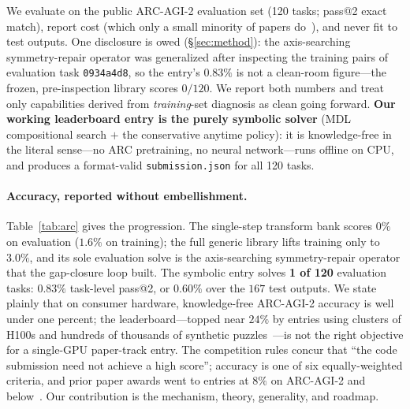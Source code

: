 We evaluate on the public ARC-AGI-2 evaluation set (120 tasks; pass@2 exact match), report cost (which only
a small minority of papers do~\cite{survey2026arc}), and never fit to test outputs. One disclosure is owed
(\S\ref{sec:method}): the axis-searching symmetry-repair operator was generalized after inspecting the
training pairs of evaluation task \texttt{0934a4d8}, so the entry's $0.83\%$ is not a clean-room figure---the
frozen, pre-inspection library scores $0/120$. We report both numbers and treat only capabilities derived from
\emph{training}-set diagnosis as clean going forward. \textbf{Our working
leaderboard entry is the purely symbolic solver} (MDL compositional search $+$ the conservative anytime
policy): it is knowledge-free in the literal sense---no ARC pretraining, no neural network---runs offline on
CPU, and produces a format-valid \texttt{submission.json} for all 120 tasks.

\paragraph{Accuracy, reported without embellishment.} Table~\ref{tab:arc} gives the progression. The
single-step transform bank scores $0\%$ on evaluation ($1.6\%$ on training); the full generic library lifts
training only to $3.0\%$, and its sole evaluation solve is the axis-searching symmetry-repair operator that
the gap-closure loop built. The symbolic entry solves \textbf{1 of 120} evaluation tasks: $0.83\%$ task-level
pass@2, or $0.60\%$ over the $167$ test outputs. We state plainly that on consumer hardware, knowledge-free ARC-AGI-2
accuracy is well under one percent; the leaderboard---topped near $24\%$ by entries using clusters of H100s
and hundreds of thousands of synthetic puzzles~\cite{arcprize2025techreport}---is not the right objective for
a single-GPU paper-track entry. The competition rules concur that ``the code submission need not achieve a
high score''; accuracy is one of six equally-weighted criteria, and prior paper awards went to entries at
$8\%$ on ARC-AGI-2 and below~\cite{jolicoeur2025trm,liao2025compressarc}. Our contribution is the mechanism,
theory, generality, and roadmap.

